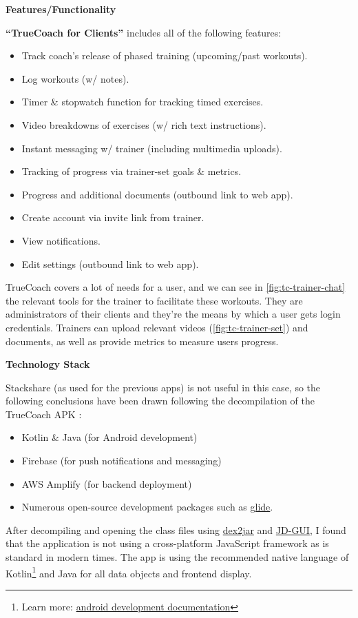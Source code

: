 \textbf{Features/Functionality}
\label{research-breakdown:tc-features}
\par
\textbf{``TrueCoach for Clients''} includes all of the following features:
\begin{multicols}{2}
	\begin{itemize}[noitemsep]
		\item Track coach's release of phased training (upcoming/past workouts).
		\item Log workouts (w/ notes).
		\item Timer \& stopwatch function for tracking timed exercises.
		\item Video breakdowns of exercises (w/ rich text instructions).
		\item Instant messaging w/ trainer (including multimedia uploads).
		\item Tracking of progress via trainer-set goals \& metrics.
		\item Progress and additional documents (outbound link to web app).
		\item Create account via invite link from trainer.
		\item View notifications.
		\item Edit settings (outbound link to web app).
	\end{itemize}
\end{multicols}
\vspace*{-5mm}
TrueCoach covers a lot of needs for a user, and we can see in \cref{fig:tc-trainer-chat} 
the relevant tools for the trainer to facilitate these workouts. They are administrators of their
clients and they're the means by which a user gets login credentials. 
Trainers can upload relevant videos (\cref{fig:tc-trainer-set}) and documents, as well as provide metrics
to measure users progress.
\par
\textbf{Technology Stack}
\label{research-breakdown:tc-stack}
\par
Stackshare (as used for the previous apps) is not useful in this case, so the following conclusions have
been drawn following the decompilation of the TrueCoach APK \cite{apk-decompiler}:
\begin{itemize}
	\item Kotlin \& Java (for Android development)
	\item Firebase (for push notifications and messaging)
	\item AWS Amplify (for backend deployment)
	\item Numerous open-source development packages such as \href{https://github.com/bumptech/glide}{glide}. 
\end{itemize}
After decompiling and opening the class files using \href{https://github.com/pxb1988/dex2jar}{dex2jar} and
\href{https://java-decompiler.github.io/}{JD-GUI}, I found that the application is not using a cross-platform
JavaScript framework as is standard in modern times. The app is using the recommended native language
of Kotlin\footnote{Learn more: \href{https://developer.android.com/kotlin}{android development documentation}} and Java for all data objects and frontend display. 
\pagebreak

